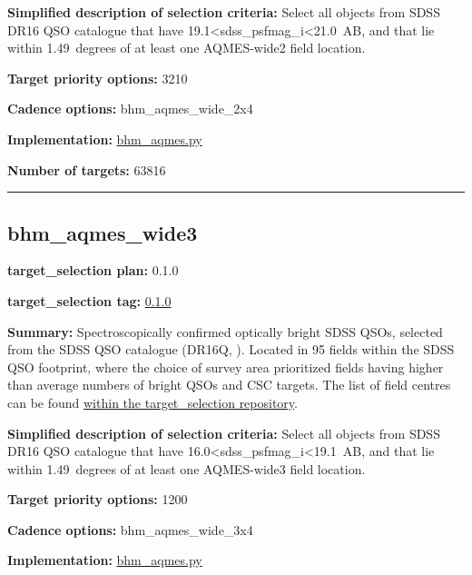 \noindent\textbf{Simplified description of selection criteria:} Select all
objects from SDSS DR16 QSO catalogue that have
19.1\textless sdss\_psfmag\_i\textless21.0~AB, and that lie within
1.49~degrees of at least one AQMES-wide2 field location.


\noindent\textbf{Target priority options:} 3210

\noindent\textbf{Cadence options:} bhm\_aqmes\_wide\_2x4

\noindent\textbf{Implementation:}
\href{https://github.com/sdss/target_selection/blob/0.1.0/python/target_selection/cartons/bhm_aqmes.py}{bhm\_aqmes.py}

\noindent\textbf{Number of targets:} 63816

\begin{center}\rule{0.5\linewidth}{0.5pt}\end{center}

\hypertarget{bhm_aqmes_wide3_plan0.1.0}{%
\subsection{bhm\_aqmes\_wide3}\label{bhm_aqmes_wide3_plan0.1.0}}

\noindent\textbf{target\_selection plan:} 0.1.0

\noindent\textbf{target\_selection tag:}
\href{https://github.com/sdss/target_selection/tree/0.1.0/}{0.1.0}

\noindent\textbf{Summary:} Spectroscopically confirmed optically bright SDSS
QSOs, selected from the SDSS QSO catalogue (DR16Q,
\citealt{Lyke2020}). Located in 95 fields within the SDSS QSO footprint,
where the choice of survey area prioritized fields having higher than
average numbers of bright QSOs and CSC targets. The list of field
centres can be found
\href{https://github.com/sdss/target_selection/blob/0.1.0/python/target_selection/masks/candidate_target_fields_bhm_aqmes_wide_v0.2.1.fits}{within
the target\_selection repository}.

\noindent\textbf{Simplified description of selection criteria:} Select all
objects from SDSS DR16 QSO catalogue that have
16.0\textless sdss\_psfmag\_i\textless19.1~AB, and that lie within
1.49~degrees of at least one AQMES-wide3 field location.


\noindent\textbf{Target priority options:} 1200

\noindent\textbf{Cadence options:} bhm\_aqmes\_wide\_3x4

\noindent\textbf{Implementation:}
\href{https://github.com/sdss/target_selection/blob/0.1.0/python/target_selection/cartons/bhm_aqmes.py}{bhm\_aqmes.py}


